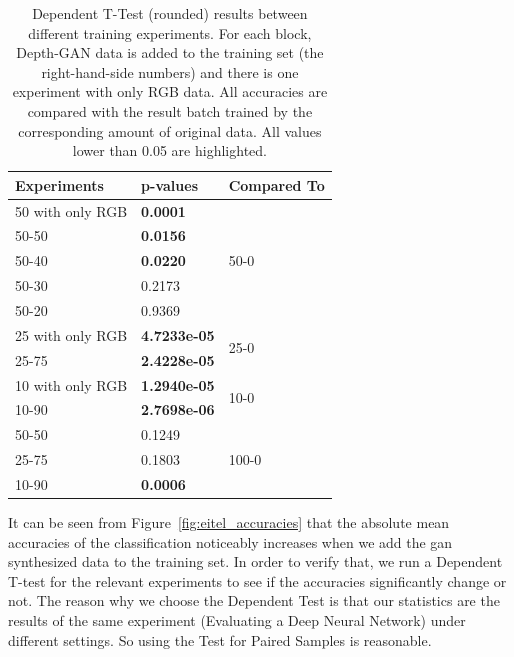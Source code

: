 \begin{table}[h!]
	\centering
	\caption{Dependent T-Test (rounded) results between different training experiments.
		For each block, Depth-GAN data is added to the training set (the
		right-hand-side numbers) and there is one experiment with only RGB data. All
		accuracies are compared with the result batch trained by the corresponding amount
		of original data. All values lower than 0.05 are highlighted.
	}
	\label{tab:t_test}
	\begin{tabular}{|l|l|l|}
		\hline
		Experiments      & p-values                        & Compared To            \\ \hline
		50 with only RGB & \textbf{0.0001} & \multirow{5}{*}{50-0}  \\ \cline{1-2}
		50-50            & \textbf{0.0156}   &                        \\ \cline{1-2}
		50-40            & \textbf{0.0220}   &                        \\ \cline{1-2}
		50-30            & 0.2173 			 &                        \\ \cline{1-2}
		50-20            & 0.9369 			 &                        \\ \hline
		25 with only RGB & \textbf{4.7233e-05} & \multirow{2}{*}{25-0}  \\ \cline{1-2}
		25-75            & \textbf{2.4228e-05} &                        \\ \hline
		10 with only RGB & \textbf{1.2940e-05}  & \multirow{2}{*}{10-0}  \\ \cline{1-2}
		10-90            & \textbf{2.7698e-06} &                        \\ \hline
		50-50            & 0.1249				& \multirow{3}{*}{100-0} \\ \cline{1-2}
		25-75            & 0.1803				&                        \\ \cline{1-2}
		10-90            & \textbf{0.0006}  	&                        \\ \hline
	\end{tabular}
\end{table}

It can be seen from Figure~\ref{fig:eitel_accuracies} that the absolute mean accuracies of
the classification noticeably increases when we add the \acrshort{gan} synthesized data to
the training set. In order to verify that, we run a Dependent T-test for the relevant
experiments to see if the accuracies significantly change or not. The reason why we choose
the Dependent Test is that our statistics are the results of the same experiment
(Evaluating a Deep Neural Network) under different settings. So using the Test for Paired
Samples is reasonable.

